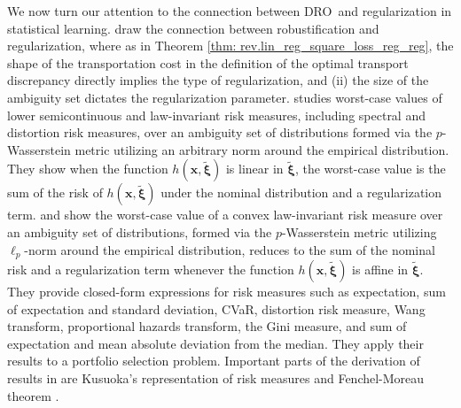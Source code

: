 \documentclass[final,onefignum,onetabnum]{class}
\newcommand{\bs}[1]{\boldsymbol{#1}} %
\newcommand{\txi}{\tilde{\bs{\xi}}}
\newcommand{\dro}{DRO}
\begin{document}
We now turn our attention to the connection between \dro\ and regularization in statistical learning. 
\citet{pflug2012,pichler2013,wozabal2014} draw the connection between robustification and regularization, where as in Theorem \ref{thm: rev.lin_reg_square_loss_reg_reg},  the shape of the transportation cost in the definition of the optimal transport discrepancy directly implies the type of regularization, and (ii) the size of the ambiguity set dictates the regularization parameter. \citet{pichler2013} studies worst-case values of lower semicontinuous and law-invariant risk measures, including  spectral
and distortion risk measures, over an ambiguity set of distributions formed via the   $p$-Wasserstein metric utilizing an arbitrary norm around the empirical distribution. They show when the  function $h(\bs{x},\txi)$ is linear in $\txi$, the worst-case value is the sum of the risk of $h(\bs{x},\txi)$ under the nominal distribution and a regularization term. 
\citet{pflug2012} and \citet{wozabal2014}  show the worst-case value of a convex law-invariant risk measure
over an ambiguity set of distributions, formed via the  $p$-Wasserstein metric utilizing $\ell_{p}$-norm around the empirical distribution,  reduces to the sum of the nominal risk
and a regularization term whenever the  function $h(\bs{x},\txi)$ is affine in $\txi$.%
They provide closed-form expressions for risk measures such as expectation, sum of expectation and  standard deviation, 
CVaR, distortion risk measure, Wang transform, proportional hazards transform, 
the Gini measure, and sum of expectation and mean absolute deviation from the median. They apply their results to a portfolio selection problem. %
Important parts of the derivation of results in \citet{pflug2012,pichler2013,wozabal2014}   are Kusuoka's representation of risk measures \citep{kusuoka2001,shapiro2013kusuoka} and Fenchel-Moreau theorem \citep{rockafellar1997,ruszczynski2006optimization}. 

\end{document}

